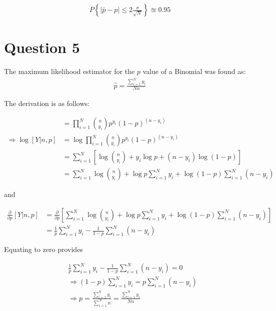 \documentclass{article}[12 pt]
\begin{document}
\begin{align*}
	P \left \{|\bar{p}-p| \leq 2 \frac{\sigma}{\sqrt{N}} \right \}\approxeq 0.95
\end{align*}


\section*{Question 5}

The maximum likelihood estimator for the $p$ value of a Binomial was found as:
\begin{align*}
	\hat{p} = \frac{\sum^{N}_{i=1}y_i}{Nn}
\end{align*}

\noindent
The derivation is as follows:

\begin{align*}
	[Y|n,p] &= \prod_{i=1}^{N}{n \choose y_i}p^{y_i}(1-p)^{(n-y_i)} \\
	\Rightarrow \log [Y|n,p] &= \log \prod_{i=1}^{N}{n \choose y_i}p^{y_i}(1-p)^{(n-y_i)} \\
	&= \sum_{i=1}^{N}\left [ \log {n \choose y_i} + y_{i}\log p +(n-y_{i})\log (1-p) \right ] \\
	&= \sum_{i=1}^{N} \log {n \choose y_i} + \log p \sum_{i=1}^{N}y_{i} + \log (1-p) \sum_{i=1}^{N}(n-y_{i}) 
\end{align*}

\noindent
and 

\begin{align*}
\frac{\partial}{\partial p}[Y|n,p] &= \frac{\partial}{\partial p} \left [ \sum_{i=1}^{N} \log {n \choose y_i} + \log p \sum_{i=1}^{N}y_{i} + \log (1-p) \sum_{i=1}^{N}(n-y_{i}) \right ]\\
&= \frac{1}{p}\sum_{i=1}^{N}y_{i} - \frac{1}{1-p} \sum_{i=1}^{N} (n-y_{i})
\end{align*}

\noindent
Equating to zero provides

\begin{align*}
&\frac{1}{p}\sum_{i=1}^{N}y_{i} - \frac{1}{1-p} \sum_{i=1}^{N} (n-y_{i}) = 0\\
&\Rightarrow (1-p)\sum_{i=1}^{N} y_{i} = p \sum_{i=1}^{N}(n-y_{i}) \\
&\Rightarrow p = \frac{\sum_{i=1}^{N} y_{i}}{\sum_{i=1}^{N} n} = \frac{\sum_{i=1}^{N} y_{i}}{Nn}
\end{align*}
\end{document}
